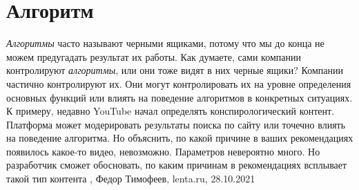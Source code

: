  
 
 
 
 
\chapter{Алгоритм}

\emph{Алгоритмы} часто называют черными ящиками, потому что мы до конца не
можем предугадать результат их работы. Как думаете, сами компании контролируют
\emph{алгоритмы}, или они тоже видят в них черные ящики?  Компании частично
контролируют их. Они могут контролировать их на уровне определения основных
функций или влиять на поведение алгоритмов в конкретных ситуациях. К примеру,
недавно YouTube начал определять конспирологический контент. Платформа может
модерировать результаты поиска по сайту или точечно влиять на поведение
алгоритма. Но объяснить, по какой причине в ваших рекомендациях появилось
какое-то видео, невозможно. Параметров невероятно много. Но разработчик сможет
обосновать, по каким причинам в рекомендациях всплывает такой тип контента
, 
Федор Тимофеев, lenta.ru, 28.10.2021
